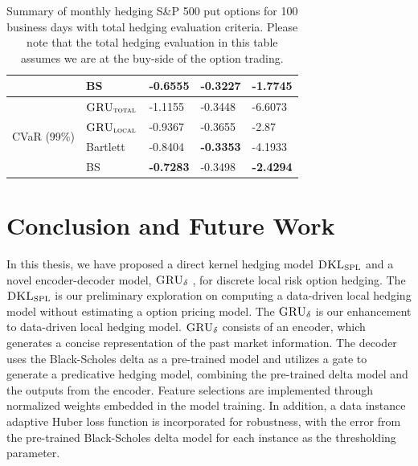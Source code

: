 \documentclass[letterpaper,12pt,titlepage,oneside,final]{book}
\numberwithin{equation}{section}
\theoremstyle{definition}
\newcommand{\model}{\textsc{GRU}_\delta}
\newcommand{\modelT}{\textsc{GRU}_{\textsc{total}}}
\newcommand{\modelL}{\textsc{GRU}_{\textsc{local}}}
\newcommand{\DKLs}{\bf\textsc{DKL}_{\text{SPL}}}
\begin{document}
\begin{table}[htp!]
\begin{tabular}{ll|l|l|l|}
		\multicolumn{1}{|l|}{}                                & BS       	&\textbf{-0.6555} &-0.3227 &\textbf{-1.7745}         \\ 
		\hline
		\multicolumn{1}{|l|}{\multirow{4}{*}{CVaR (99\%)}}    & $\modelT$   &-1.1155 &-0.3448 &-6.6073 \\  
		\multicolumn{1}{|l|}{}                                & $\modelL$   &-0.9367 &-0.3655 &-2.87          \\  
		\multicolumn{1}{|l|}{}                                & Bartlett 	&-0.8404 &\textbf{-0.3353} &-4.1933          \\  
		\multicolumn{1}{|l|}{}                                & BS       	&\textbf{-0.7283} &-0.3498 &\textbf{-2.4294}          \\ 
		\hline
	\end{tabular}
	\caption{Summary of monthly hedging S\&P 500 put options for 100 business days with total hedging evaluation criteria. Please note that the total hedging evaluation in this table assumes we are at the buy-side of the option trading.}
	\label{table:putTotalMBuy}
\end{table}
\chapter{Conclusion and Future Work}
\label{sec:Conclusion}

In this thesis, we have proposed a direct kernel hedging model $\DKLs$ and a novel encoder-decoder  model, $\model$ , for discrete local risk option hedging. The $\DKLs$ is our preliminary exploration on computing a data-driven local hedging model without estimating a option pricing model. The $\model$ is our enhancement to data-driven local hedging model. $\model$ consists of an encoder, which generates a concise representation of the past market  information. The decoder uses the Black-Scholes delta as a pre-trained model and utilizes a gate to generate a predicative hedging model,  combining the pre-trained delta model and the outputs from the encoder. Feature selections are implemented through normalized weights embedded in the model training. In addition, a data instance adaptive Huber loss function is incorporated  for robustness, with the error from the pre-trained Black-Scholes delta model for each instance as the thresholding parameter. 
\end{document}
